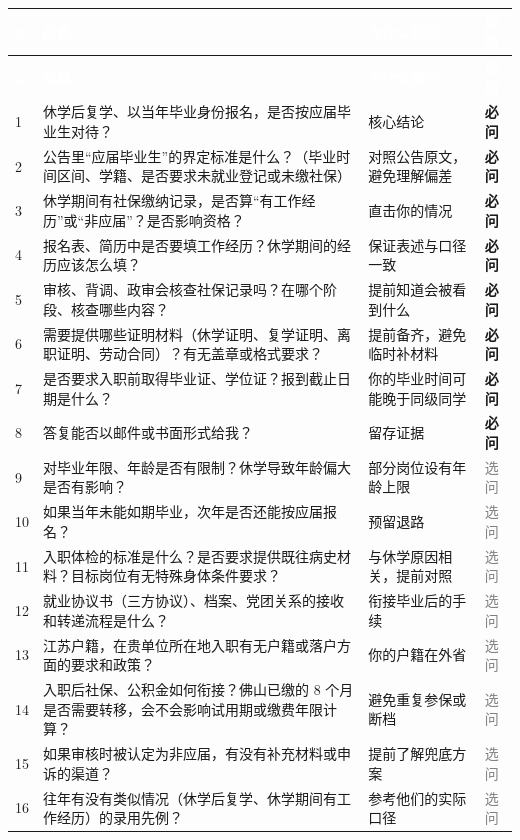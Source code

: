 \documentclass[UTF8,fontset=fandol,zihao=-4]{ctexart}
\newcommand{\hc}[1]{\textcolor{white}{\heiti\bfseries #1}}
\newcommand{\reqq}{\textcolor{highc}{\bfseries 必问}}
\newcommand{\optt}{\textcolor{gray}{选问}}
\begin{document}
\begingroup
{}
\begin{longtable}{@{}P{0.87cm}P{7.18cm}P{5.43cm}P{1.65cm}@{}}
\hc{\#} & \hc{问题} & \hc{为什么要问} & \hc{级别}\\
\endfirsthead
{}\hc{\#} & \hc{问题} & \hc{为什么要问} & \hc{级别}\\
 & 休学后复学、以当年毕业身份报名，是否按应届毕业生对待？ & 核心结论 & \reqq{}\\
2 & 公告里“应届毕业生”的界定标准是什么？（毕业时间区间、学籍、是否要求未就业登记或未缴社保） & 对照公告原文，避免理解偏差 & \reqq{}\\
3 & 休学期间有社保缴纳记录，是否算“有工作经历”或“非应届”？是否影响资格？ & 直击你的情况 & \reqq{}\\
4 & 报名表、简历中是否要填工作经历？休学期间的经历应该怎么填？ & 保证表述与口径一致 & \reqq{}\\
5 & 审核、背调、政审会核查社保记录吗？在哪个阶段、核查哪些内容？ & 提前知道会被看到什么 & \reqq{}\\
6 & 需要提供哪些证明材料（休学证明、复学证明、离职证明、劳动合同）？有无盖章或格式要求？ & 提前备齐，避免临时补材料 & \reqq{}\\
7 & 是否要求入职前取得毕业证、学位证？报到截止日期是什么？ & 你的毕业时间可能晚于同级同学 & \reqq{}\\
8 & 答复能否以邮件或书面形式给我？ & 留存证据 & \reqq{}\\
9 & 对毕业年限、年龄是否有限制？休学导致年龄偏大是否有影响？ & 部分岗位设有年龄上限 & \optt{}\\
10 & 如果当年未能如期毕业，次年是否还能按应届报名？ & 预留退路 & \optt{}\\
11 & 入职体检的标准是什么？是否要求提供既往病史材料？目标岗位有无特殊身体条件要求？ & 与休学原因相关，提前对照 & \optt{}\\
12 & 就业协议书（三方协议）、档案、党团关系的接收和转递流程是什么？ & 衔接毕业后的手续 & \optt{}\\
13 & 江苏户籍，在贵单位所在地入职有无户籍或落户方面的要求和政策？ & 你的户籍在外省 & \optt{}\\
14 & 入职后社保、公积金如何衔接？佛山已缴的 8 个月是否需要转移，会不会影响试用期或缴费年限计算？ & 避免重复参保或断档 & \optt{}\\
15 & 如果审核时被认定为非应届，有没有补充材料或申诉的渠道？ & 提前了解兜底方案 & \optt{}\\
16 & 往年有没有类似情况（休学后复学、休学期间有工作经历）的录用先例？ & 参考他们的实际口径 & \optt{}\\
\end{longtable}
\endgroup
\end{document}
